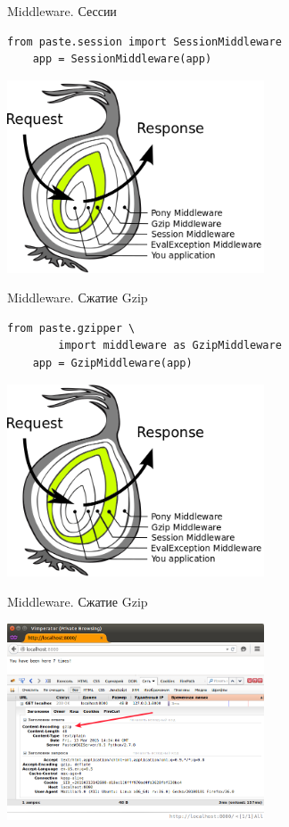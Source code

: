 \begin{frame}[fragile]{Middleware. Сессии}
    \begin{lstlisting}[style=python]
    from paste.session import SessionMiddleware
    app = SessionMiddleware(app)
    \end{lstlisting}
    \begin{center}
        \includegraphics[width=3in]{media/wsgi_as_onion_session.png}
    \end{center}
\end{frame}

\begin{frame}[fragile]{Middleware. Сжатие Gzip}
    \begin{lstlisting}[style=python]
    from paste.gzipper \
        import middleware as GzipMiddleware
    app = GzipMiddleware(app)
    \end{lstlisting}
    \begin{center}
        \includegraphics[width=3in]{media/wsgi_as_onion_gzip.png}
    \end{center}
\end{frame}

\begin{frame}{Middleware. Сжатие Gzip}
    \begin{center}
        \includegraphics[width=3in]{media/wsgi_example_gzip.png}
    \end{center}
\end{frame}

